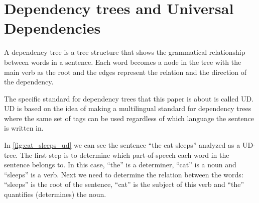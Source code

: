 

\section{Dependency trees and Universal Dependencies}
A dependency tree is a tree structure that shows the grammatical relationship between words in a sentence\cite{tesniere2015elements,nivre2006inductive}. Each word becomes a node in the tree with the main verb as the root and the edges represent the relation and the direction of the dependency.

The specific standard for dependency trees that this paper is about is called \ac{UD}\cite{nivre-etal-2016-universal}. UD is based on the idea of making a multilingual standard for dependency trees where the same set of tags can be used regardless of which language the sentence is written in.

In \autoref{fig:cat_sleeps_ud} we can see the sentence ``the cat sleeps'' analyzed as a UD-tree. The first step is to determine which part-of-speech each word in the sentence belongs to. In this case, ``the'' is a determiner, ``cat'' is a noun and ``sleeps'' is a verb. Next we need to determine the relation between the words: ``sleeps'' is the root of the sentence, ``cat'' is the subject of this verb and ``the'' quantifies (determines) the noun.





